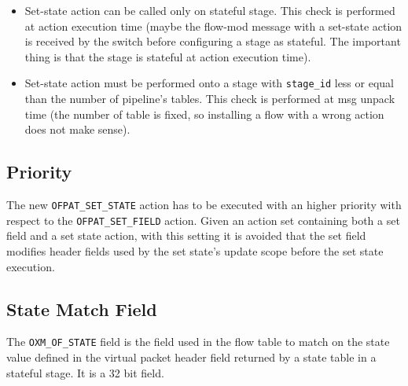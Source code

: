 \begin{itemize}
\item Set-state action can be called only on stateful stage. This check is performed at action execution time (maybe the flow-mod message with a set-state action is received by the switch before configuring a stage as stateful. The important thing is that the stage is stateful at action execution time).

\item Set-state action must be performed onto a stage with \texttt{stage\_id} less or equal than the number of pipeline’s tables. This check is performed at msg unpack time (the number of table is fixed, so installing a flow with a wrong action does not make sense). 
\end{itemize}

\subsection{Priority}

The new \texttt{OFPAT\_SET\_STATE} action has to be executed with an higher priority with respect to the \texttt{OFPAT\_SET\_FIELD} action. Given an action set containing both a set field and a set state action, with this setting it is avoided that the set field modifies header fields used by the set state's update scope before the set state execution.


\subsection{State Match Field}
\label{sec:match_state}

The \texttt{OXM\_OF\_STATE} field is the field used in the flow table to match on the state value defined in the virtual packet header field returned by a state table in a stateful stage. It is a 32 bit field.


